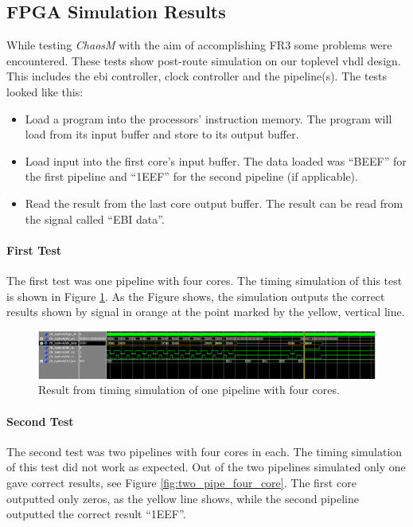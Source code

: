 
\subsection{FPGA Simulation Results}
While testing \textit{ChaosM} with the aim of accomplishing FR3
some problems were encountered. These tests show post-route simulation on our
toplevel vhdl design. This includes the ebi controller, clock controller and the pipeline(s).
The tests looked like this:

\begin{itemize}
\item Load a program into the processors’ instruction memory. The program will load from its input buffer and store to its output buffer.\\
\item Load input into the first core’s input buffer. The data loaded was “BEEF” for the first pipeline and “1EEF” for the second pipeline (if applicable).\\
\item Read the result from the last core output buffer. The result can be read from the signal called “EBI data”.\\
\end{itemize}


\paragraph{First Test}

The first test was one pipeline with four cores. The timing simulation of this
test is  shown in Figure \ref{fig:one_pipe_four_core}. As the Figure shows,
the simulation outputs the correct results shown by signal in orange at the
point  marked by the yellow, vertical line.

\begin{figure}[H]
    \includegraphics[width=1.3\textwidth]{figures/fpga/result_1_pipe_4_cores.PNG}
    \caption{Result from timing simulation of one pipeline with four cores.}
    \label{fig:one_pipe_four_core}
\end{figure}

\paragraph{Second Test}
The second test was two pipelines with four cores in each. The timing simulation
of this test did not work as expected. Out of the two pipelines simulated only one
gave correct results, see Figure \ref{fig:two_pipe_four_core}. The first core
outputted only zeros, as the yellow line shows,  while the second pipeline outputted the correct result “1EEF”.

